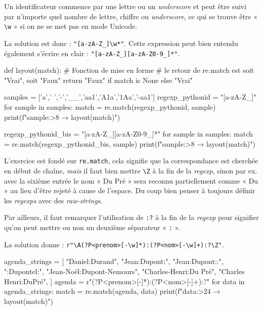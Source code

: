 
\begin{solution}[ID=7]
Un identificateur commence par une lettre ou un \textit{underscore} et peut être suivi par n'importe quel nombre de lettre, chiffre ou \textit{underscore}, ce qui se trouve être « \texttt{\textbackslash{w}} » si on ne se met pas en mode Unicode.

La solution est donc : \lstinline[basicstyle={\shellttfont}]{"[a-zA-Z_]\w*"}. Cette expression peut bien entendu également s'écrire en clair : \lstinline[basicstyle={\shellttfont}]{"[a-zA-Z_][a-zA-Z0-9_]*"}.

\begin{idleconsole}
	\begin{pyconsole}
def layout(match): # Fonction de mise en forme
    # le retour de re.match est soit "Vrai", soit "Faux"
    return "Faux" if match is None else "Vrai"

samples = ['a',' ','-','__','aa1','A1a','1Aa','-aa1']
regexp_pythonid = "[a-zA-Z_]\w*"
for sample in samples:
    match = re.match(regexp_pythonid, sample)
    print(f"{sample:>8} → {layout(match)}")

regexp_pythonid_bis = "[a-zA-Z_][a-zA-Z0-9_]*"
for sample in samples:
    match = re.match(regexp_pythonid_bis, sample)
    print(f"{sample:>8} → {layout(match)}")

	\end{pyconsole}
\end{idleconsole}
\end{solution}


\begin{solution}
L'exercice est fondé sur \texttt{re.match}, cela signifie que la correspondance est cherchée en début de chaîne, \emph{mais} il faut bien mettre \lstinline[basicstyle={\shellttfont}]{\Z} à la fin de la \textit{regexp}, sinon par ex. avec la sixième entrée le nom « Du Pré » sera reconnu partiellement comme « Du » au lieu d'être rejeté à cause de l'espace. Du coup bien penser à toujours définir les \textit{regexps} avec des \textit{raw-strings}.

Par ailleurs, il faut remarquer l'utilisation de \texttt{:?} à la fin de la \textit{regexp} pour signifier qu'on peut mettre ou non un deuxième séparateur « \texttt{:} ».

La solution donne : \lstinline[basicstyle={\shellttfont}]{r"\A(?P<prenom>[-\w]*):(?P<nom>[-\w]+):?\Z"}.

\begin{idleconsole}
	\begin{pyconsole}
agenda_strings = [
    "Daniel:Durand",
    "Jean:Dupont:",
    "Jean:Dupont::",
    ":Dupontel:",
    "Jean-Noël:Dupont-Nemours",
    "Charles-Henri:Du Pré",
    "Charles Henri:DuPré",
]
agenda = r"\A(?P<prenom>[-\w]*):(?P<nom>[-\w]+):?\Z"
for data in agenda_strings:
    match = re.match(agenda, data)
    print(f"{data:>24} → {layout(match)}")

	\end{pyconsole}
\end{idleconsole}
\end{solution}

